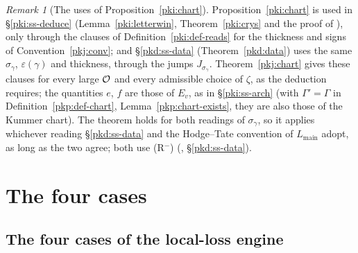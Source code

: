 \documentclass[10pt]{amsart}
\theoremstyle{definition}
\theoremstyle{remark}
\newtheorem{remark}[theorem]{Remark}
\newcommand{\Q}{\mathbb Q}
\begin{document}
\begin{remark}[The uses of Proposition~\ref{pki:chart}]\label{pkj:uses}
Proposition~\ref{pki:chart} is used in \S\ref{pki:ss-deduce} (Lemma~\ref{pki:letterwin},
Theorem~\ref{pki:crys} and the proof of {\cite[Theorem~5.8]{P55}}), only through the clauses of
Definition~\ref{pki:def-reads} for the thickness and signs of Convention~\ref{pkj:conv}; and
\S\ref{pkd:ss-data} (Theorem~\ref{pkd:data}) uses the same $\sigma_\gamma$, $\varepsilon(\gamma)$ and
thickness, through the jumps $J_{\sigma_\gamma}$. Theorem~\ref{pkj:chart} gives these clauses for every
large $\auO$ and every admissible choice of $\zeta$, as the deduction requires; the quantities $e$, $f$
are those of $E_v$, as in \S\ref{pki:ss-arch} (with $\Gamma'=\Gamma$ in Definition~\ref{pkp:def-chart},
Lemma~\ref{pkp:chart-exists}, they are also those of the Kummer chart). The theorem holds for both
readings of $\sigma_\gamma$, so it applies whichever reading \S\ref{pkd:ss-data} and the Hodge--Tate
convention of $L_{\mathrm{main}}$ adopt, as long as the two agree; both use (R$^-$) ({\cite[\S5.1]{P55}}, \S\ref{pkd:ss-data}).
\end{remark}



\section{The four cases}\label{C4:g7}
\providecommand{\auO}{\mathcal O}
\providecommand{\auQlb}{\overline{\Q}_\ell}
\providecommand{\pllZf}{Z_f}
\providecommand{\pllrk}{\operatorname{rk}}
\providecommand{\plldef}{\delta^{\vee}}
\providecommand{\pglen}{\operatorname{len}}
\providecommand{\pkiWin}{\operatorname{Win}}
\providecommand{\pkiC}{\mathcal C}
\providecommand{\pkilog}{\operatorname{lg}}
\providecommand{\pkpA}{A_{\mathrm{inf}}}
\providecommand{\pkpAmb}{\mathbb A}
\providecommand{\pkcPt}{\mathrm{Pt}}
\providecommand{\pkcimp}{\mathrm{imp}}
\providecommand{\pkcpd}{\mathrm{pd}}
\providecommand{\pkcdep}{\mathrm{dep}}
\providecommand{\pkcsh}{\mathrm{sh}}
\providecommand{\pkcNM}{\mathrm{NM}}
\providecommand{\pkcnw}{\mathrm{nw}}
\providecommand{\pkcSig}{\Sigma}

\subsection{The four cases of the local-loss engine}\label{pkc:sec}
\end{document}
